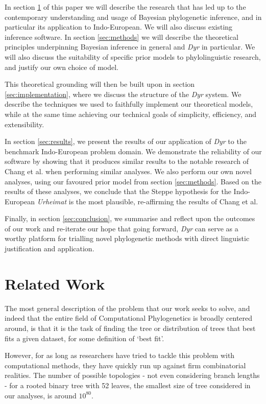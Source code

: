 \documentclass[10pt,journal,compsoc]{IEEEtran}
\begin{document}
In section \ref{sec:related} of this paper we will describe the research that has led up to the contemporary understanding and usage of Bayesian phylogenetic inference, and in particular its application to Indo-European. We will also discuss existing inference software. In section \ref{sec:methods} we will describe the theoretical principles underpinning Bayesian inference in general and \textit{Dyr} in particular. We will also discuss the suitability of specific prior models to phylolinguistic research, and justify our own choice of model. 

This theoretical grounding will then be built upon in section \ref{sec:implementation}, where we discuss the structure of the \textit{Dyr} system. We describe the techniques we used to faithfully implement our theoretical models, while at the same time achieving our technical goals of simplicity, efficiency, and extensibility.

In section \ref{sec:results}, we present the results of our application of \textit{Dyr} to the benchmark Indo-European problem domain. We demonstrate the reliability of our software by showing that it produces similar results to the notable research of Chang et al.\cite{chang2015ancestry} when performing similar analyses. We also perform our own novel analyses, using our favoured prior model from section \ref{sec:methods}. Based on the results of these analyses, we conclude that the Steppe hypothesis for the Indo-European \textit{Urheimat} is the most plausible, re-affirming the results of Chang et al.

Finally, in section \ref{sec:conclusion}, we summarise and reflect upon the outcomes of our work and re-iterate our hope that going forward, \textit{Dyr} can serve as a worthy platform for trialling novel phylogenetic methods with direct linguistic justification and application.

\section{Related Work}\label{sec:related}

The most general description of the problem that our work seeks to solve, and indeed that the entire field of Computational Phylogenetics is broadly centered around, is that it is the task of finding the tree or distribution of trees that best fits a given dataset, for some definition of `best fit'.

However, for as long as researchers have tried to tackle this problem with computational methods, they have quickly run up against firm combinatorial realities. The number of possible topologies - not even considering branch lengths - for a rooted binary tree with 52 leaves, the smallest size of tree considered in our analyses, is around $10^{80}$.
\end{document}
